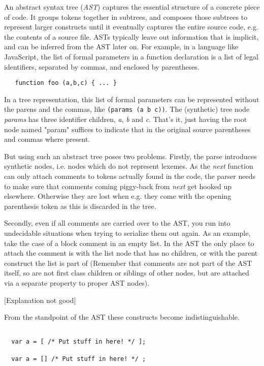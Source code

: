 \documentclass[11pt,a4paper]{article}
\begin{document}
An abstract syntax tree (\emph{AST}) captures the essential structure of a
concrete piece of code. It groups tokens together in subtrees, and composes
those subtrees to represent larger constructs until it eventually captures the
entire source code, e.g. the contents of a source file. ASTs typically leave out
information that is implicit, and can be inferred from the AST later on. For
example, in a language like JavaScript, the list of formal parameters in a
function declaration is a list of legal identifiers, separated by commas, and
enclosed by parentheses.

\begin{verbatim}
   function foo (a,b,c) { ... }
\end{verbatim}

In a tree representation, this list of formal parameters can be represented
without the parens and the commas, like \texttt{(params (a b c))}. The
(synthetic) tree node \emph{params} has three identifier children, \emph{a},
\emph{b} and \emph{c}. That's it, just having the root node named "param"
suffices to indicate that in the original source parentheses and commas where
present.

But using such an abstract tree poses two problems. Firstly, the parse
introduces synthetic nodes, i.e. nodes which do not represent lexemes. As the
\emph{next} function can only attach comments to tokens actually found in the
code, the parser needs to make sure that comments coming piggy-back from
\emph{next} get hooked up elsewhere. Otherwise they are lost when e.g. they come
with the opening parenthesis token as this is discarded in the tree.

Secondly, even if all comments are carried over to the AST, you run into
undecidable situations when trying to serialize them out again. As an example,
take the case of a block comment in an empty list. In the AST the only place to
attach the comment is with the list node that has no children, or with the
parent construct the list is part of (Remember that
comments are not part of the AST itself, so are not first class children or
siblings of
other nodes,  but are attached via a separate property to proper AST nodes).

[Explanation not good]

From the standpoint of the AST these constructs become indistinguishable.

\begin{verbatim}

  var a = [ /* Put stuff in here! */ ];

  var a = [] /* Put stuff in here! */ ;

\end{verbatim}
\end{document}
